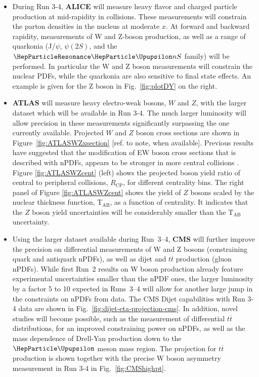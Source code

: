 \documentclass[../report.tex]{subfiles}
\begin{document}
\begin{itemize}
\item During Run 3-4, \textbf{ALICE} will measure heavy flavor and charged particle production at mid-rapidity in \pPb collisions. These measurements will constrain the parton densities in the nucleus at moderate $x$. At forward and backward rapidity, measurements of W and Z-boson production, as well as a range of quarkonia (J/$\psi$, $\psi(2S)$, and the $\PGUP{nS}$ family) will be performed. In particular the W and Z boson measurements will constrain the nuclear PDFs, while the quarkonia are also sensitive to final state effects. An example is given for the Z boson in Fig.~\ref{fig:plotDY} on the right. 
\item \textbf{ATLAS} will measure heavy electro-weak bosons, $W$ and $Z$, with the larger \pPb dataset which will be available in Run 3-4.  The much larger luminosity will allow precision in these measurements significantly surpassing the one currently available.  Projected $W$ and $Z$ boson cross sections are shown in Figure~\ref{fig:ATLASWZxsection} [ref. to note, when available].  Previous results have suggested that the modification of EW boson cross sections that is described with nPDFs, appears to be stronger in more central collisions \cite{Aad:2015gta,TheATLAScollaboration:2015lnm}.  Figure \ref{fig:ATLASWZcent} (left) shows the projected boson yield ratio of central to peripheral collisions, $R_{\mathrm{CP}}$, for different centrality bins.  The right panel of Figure \ref{fig:ATLASWZcent} shows the yield of $Z$ bosons scaled by the nuclear thickness function, T$_{\mathrm{AB}}$,  as a function of centrality. It indicates that the $Z$ boson yield uncertainties will be considerably smaller than the T$_{\mathrm{AB}}$ uncertainty. 
\item  Using the larger \pPb dataset available during Run~3--4, \textbf{CMS} will further improve the precision on differential measurements of W and Z bosons (constraining quark and antiquark nPDFs), as well as dijet and $t\overline{t}$ production (gluon nPDFs). While first Run~2 results on W boson production already feature experimental uncertainties smaller than the nPDF ones, the larger luminosity by a factor 5 to 10 expected in Runs~3--4 will allow for another large jump in the constraints on nPDFs from data. The CMS Dijet capabilities with Run 3-4 data are shown in Fig.~\ref{fig:dijet-eta-projection-cms}. In addition, novel studies will become possible, such as the measurement of differential $t\overline{t}$ distributions, for an improved constraining power on nPDFs, as well as the mass dependence of Drell-Yan production down to the $\PGU$ meson mass region. The projection for $t\overline{t}$ production is shown together with the precise W boson asymmetry measurement in Run 3-4 in Fig.~\ref{fig:CMShighpt}.

\end{itemize}
\end{document}

